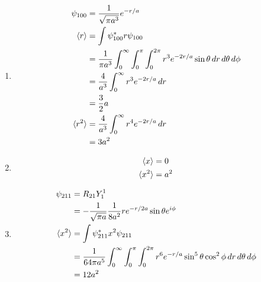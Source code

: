 \documentclass{article}
\begin{document}
\begin{enumerate}
  \item

        \begin{align*}
          \psi_{100}   & = \frac{1}{\sqrt{\pi a^3}} e^{-r / a}                                                                              \\
          \braket{r}   & = \int \psi_{100}^* r \psi_{100}                                                                                   \\
                       & = \frac{1}{\pi a^3} \int_0^\infty \int_0^\pi \int_0^{2 \pi} r^3 e^{-2 r / a} \sin \theta \,d r \,d \theta \,d \phi \\
                       & = \frac{4}{a^3} \int_0^\infty r^3 e^{-2 r / a} \,d r                                                               \\
                       & = \frac{3}{2} a                                                                                                    \\
          \braket{r^2} & = \frac{4}{a^3} \int_0^\infty r^4 e^{-2 r / a} \,d r                                                               \\
                       & = 3 a^2
        \end{align*}

  \item

        \begin{align*}
          \braket{x}   & = 0   \\
          \braket{x^2} & = a^2
        \end{align*}

  \item

        \begin{align*}
          \psi_{211}   & = R_{21} Y_1^1                                                                                                                    \\
                       & = -\frac{1}{\sqrt{\pi a}} \frac{1}{8 a^2} r e^{-r / 2 a} \sin \theta e^{i \phi}                                                   \\
          \braket{x^2} & = \int \psi_{211}^* x^2 \psi_{211}                                                                                                \\
                       & = \frac{1}{64 \pi a^5} \int_0^\infty \int_0^\pi \int_0^{2 \pi} r^6 e^{-r / a} \sin^5 \theta \cos^2 \phi \,d r \,d \theta \,d \phi \\
                       & = 12 a^2
        \end{align*}
\end{enumerate}
\end{document}
